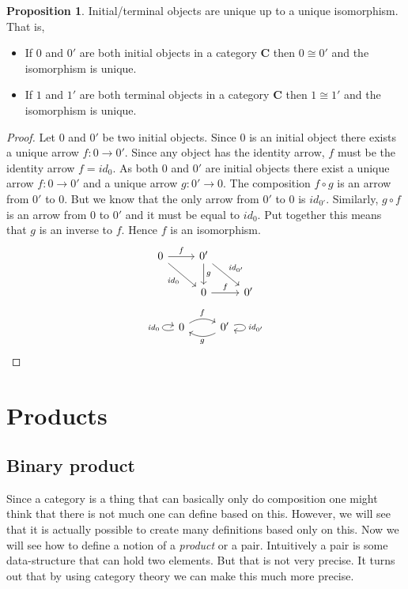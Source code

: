 \documentclass{book}
\theoremstyle{definition}
\newtheorem{proposition}{Proposition}
\newcommand\id{\mathit{id}}
\begin{document}
\begin{proposition}
  Initial/terminal objects are unique up to a unique isomorphism. That is,
  \begin{itemize}
  \item If $0$ and $0'$ are both initial objects in a category $\mathbf{C}$
    then $0 \cong 0'$ and the isomorphism is unique.
  \item If $1$ and $1'$ are both terminal objects in a category $\mathbf{C}$
    then $1 \cong 1'$ and the isomorphism is unique.
  \end{itemize}
\end{proposition}
\begin{proof}
  Let $0$ and $0'$ be two initial objects. Since $0$ is an initial object there
  exists a unique arrow $f : 0 \to 0'$. Since any object has the identity arrow,
  $f$ must be the identity arrow $f = \id_{0}$. As both $0$ and $0'$ are initial
  objects there exist a unique arrow $f : 0 \to 0'$ and a unique arrow
  $g : 0' \to 0$. The composition $f \circ g$ is an arrow from $0'$ to $0$. But we
  know that the only arrow from $0'$ to $0$ is $\id_{0'}$. Similarly,
  $g \circ f$ is an arrow from $0$ to $0'$ and it must be equal to $\id_{0}$. Put
  together this means that $g$ is an inverse to $f$. Hence $f$ is an
  isomorphism.
  \[
    \begin{tikzcd}
      0 \ar[r, "f"] \ar[dr, "\id_{0}"'] & 0' \ar[d, "g"] \ar[dr, "\id_{0'}"] \\
      & 0 \ar[r, "f"] & 0'
    \end{tikzcd}
  \]
  \[
    \begin{tikzcd}
      0 \ar[r, bend left, "f"] \ar[loop left, "\id_{0}"] & 0' \ar[l, bend left, "g"] \ar[loop right, "\id_{0'}"]
    \end{tikzcd}
  \]
\end{proof}

\section{Products}

\subsection{Binary product}

Since a category is a thing that can basically only do composition one might
think that there is not much one can define based on this. However, we will see
that it is actually possible to create many definitions based only on this. Now
we will see how to define a notion of a \emph{product} or a pair. Intuitively a
pair is some data-structure that can hold two elements. But that is not very
precise. It turns out that by using category theory we can make this much more
precise.
\end{document}
